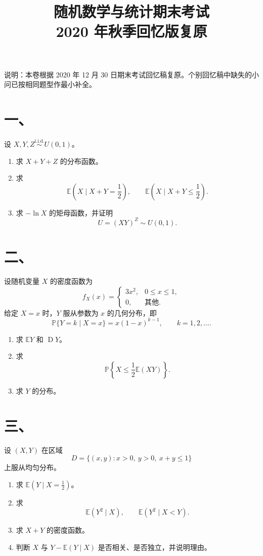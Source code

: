 \documentclass[UTF8,zihao=-4,fontset=windows]{ctexart}
\title{\vspace{-1.2cm}随机数学与统计期末考试\\{\large 2020 年秋季回忆版复原}}
\date{}
\newcommand{\Prob}{\mathbb P}
\newcommand{\EX}{\mathbb E}
\newcommand{\DD}{\operatorname D}
\newcommand{\iid}{\overset{\mathrm{i.i.d.}}{\sim}}
\begin{document}
\maketitle
\vspace{-1.6em}

说明：本卷根据 2020 年 12 月 30 日期末考试回忆稿复原。个别回忆稿中缺失的小问已按相同题型作最小补全。

\section*{一、}
设 $X,Y,Z \iid U(0,1)$。
\begin{enumerate}
  \item 求 $X+Y+Z$ 的分布函数。
  \item 求
  \[
    \EX\left(X\mid X+Y=\frac12\right),\qquad
    \EX\left(X\mid X+Y\le \frac12\right).
  \]
  \item 求 $-\ln X$ 的矩母函数，并证明
  \[
    U=(XY)^Z\sim U(0,1).
  \]
\end{enumerate}

\section*{二、}
设随机变量 $X$ 的密度函数为
\[
  f_X(x)=
  \begin{cases}
    3x^2, & 0\le x\le 1,\\
    0, & \text{其他}.
  \end{cases}
\]
给定 $X=x$ 时，$Y$ 服从参数为 $x$ 的几何分布，即
\[
  \Prob\{Y=k\mid X=x\}=x(1-x)^{k-1},\qquad k=1,2,\ldots.
\]
\begin{enumerate}
  \item 求 $\EX Y$ 和 $\DD Y$。
  \item 求
  \[
    \Prob\left\{X\le \frac12 \EX(XY)\right\}.
  \]
  \item 求 $Y$ 的分布。
\end{enumerate}

\section*{三、}
设 $(X,Y)$ 在区域
\[
  D=\{(x,y):x>0,\ y>0,\ x+y\le 1\}
\]
上服从均匀分布。
\begin{enumerate}
  \item 求 $\EX\left(Y\mid X=\frac12\right)$。
  \item 求
  \[
    \EX(Y^2\mid X),\qquad \EX(Y^2\mid X<Y).
  \]
  \item 求 $X+Y$ 的密度函数。
  \item 判断 $X$ 与 $Y-\EX(Y\mid X)$ 是否相关、是否独立，并说明理由。
\end{enumerate}
\end{document}

